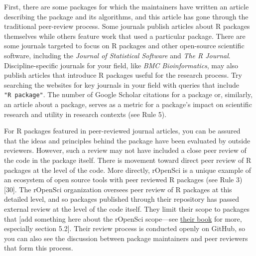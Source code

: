 \documentclass[10pt,letterpaper]{article}
\begin{document}
First, there are some packages for which the maintainers have written an
article describing the package and its algorithms, and this article has
gone through the traditional peer-review process. Some journals publish
articles about R packages themselves while others feature work that used
a particular package. There are some journals targeted to focus on R
packages and other open-source scientific software, including the
\emph{Journal of Statistical Software} and \emph{The R Journal}.
Discipline-specific journals for your field, like \emph{BMC
Bioinformatics}, may also publish articles that introduce R packages
useful for the research process. Try searching the websites for key
journals in your field with queries that include \texttt{"R\ package"}.
The number of Google Scholar citations for a package or, similarly, an
article about a package, serves as a metric for a package's impact on
scientific research and utility in research contexts (see Rule 5).

For R packages featured in peer-reviewed journal articles, you can be
assured that the ideas and principles behind the package have been
evaluated by outside reviewers. However, such a review may not have
included a close peer review of the code in the package itself. There is
movement toward direct peer review of R packages at the level of the
code. More directly, rOpenSci is a unique example of an ecosystem of
open source tools with peer reviewed R packages (see Rule 3) {[}30{]}.
The rOpenSci organization oversees peer review of R packages at this
detailed level, and so packages published through their repository has
passed external review at the level of the code itself. They limit their
scope to packages that {[}add something here about the rOpenSci
scope---see \href{https://devguide.ropensci.org/}{their book} for more,
especially section 5.2{]}. Their review process is conducted openly on
GitHub, so you can also see the discussion between package maintainers
and peer reviewers that form this process.
\end{document}
